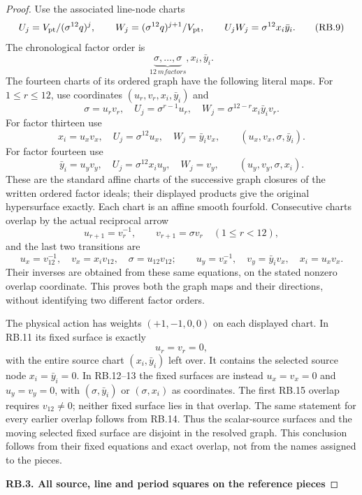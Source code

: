 \begin{proof}
Use the associated line-node charts
\[
 U_j=V_{\rm pt}/(\sigma^{12}q)^j,\qquad
 W_j=(\sigma^{12}q)^{j+1}/V_{\rm pt},\qquad
               U_jW_j=\sigma^{12}x_i\bar y_i.
 \tag{RB.9}
\]
The chronological factor order is
\[
 \underbrace{\sigma,\ldots,\sigma}_{12\ {
m factors}},
                       x_i,\bar y_i.
 \tag{RB.10}
\]
The fourteen charts of its ordered graph have the following literal
maps. For \(1\le r\le12\), use coordinates
\((u_r,v_r,x_i,\bar y_i)\) and
\[
 \sigma=u_rv_r,\quad
 U_j=\sigma^{r-1}u_r,\quad
 W_j=\sigma^{12-r}x_i\bar y_i v_r.
 \tag{RB.11}
\]
For factor thirteen use
\[
 x_i=u_xv_x,\quad U_j=\sigma^{12}u_x,\quad
 W_j=\bar y_i v_x,
 \qquad (u_x,v_x,\sigma,\bar y_i).
 \tag{RB.12}
\]
For factor fourteen use
\[
 \bar y_i=u_yv_y,\quad U_j=\sigma^{12}x_i u_y,\quad
 W_j=v_y,
 \qquad (u_y,v_y,\sigma,x_i).
 \tag{RB.13}
\]
These are the standard affine charts of the successive graph closures
of the written ordered factor ideals; their displayed products give
the original hypersurface exactly. Each chart is an affine smooth
fourfold. Consecutive charts overlap by the actual reciprocal arrow
\[
 u_{r+1}=v_r^{-1},\qquad v_{r+1}=\sigma v_r
                         \quad(1\le r<12),
 \tag{RB.14}
\]
and the last two transitions are
\[
 u_x=v_{12}^{-1},\quad v_x=x_i v_{12},\quad
 \sigma=u_{12}v_{12};\qquad
 u_y=v_x^{-1},\quad v_y=\bar y_i v_x,\quad x_i=u_xv_x.
 \tag{RB.15}
\]
Their inverses are obtained from these same equations, on the stated
nonzero overlap coordinate. This proves both the graph maps and their
directions, without identifying two different factor orders.

The physical action has weights \((+1,-1,0,0)\) on each displayed
chart. In RB.11 its fixed surface is exactly
\[
 u_r=v_r=0,
\]
with the entire source chart \((x_i,\bar y_i)\) left over. It contains
the selected source node \(x_i=\bar y_i=0\). In RB.12--13 the fixed
surfaces are instead \(u_x=v_x=0\) and \(u_y=v_y=0\), with
\((\sigma,\bar y_i)\) or \((\sigma,x_i)\) as coordinates.
The first RB.15 overlap requires \(v_{12}\ne0\); neither fixed
surface lies in that overlap. The same statement for every earlier
overlap follows from RB.14. Thus the scalar-source surfaces and the
moving selected fixed surface are disjoint in the resolved graph.
This conclusion follows from their fixed equations and exact overlap,
not from the names assigned to the pieces.

\par

\medskip\noindent\textbf{RB.3. All source, line and period squares on the reference pieces}


\end{proof}
